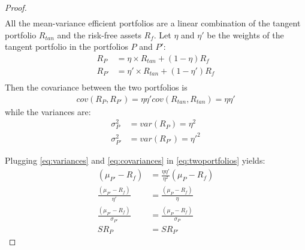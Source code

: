 \documentclass[10pt]{article}
\newenvironment{exercise}[2][Exercise]{\begin{trivlist}
  \item[\hskip \labelsep {\bfseries #1}\hskip \labelsep {\bfseries #2.}]}{\end{trivlist}}
\begin{document}
\begin{exercise}{1}
\begin{itemize}
\begin{proof}
\begin{align}
              \end{align}
              All the mean-variance efficient portfolios are a linear
              combination of the tangent portfolio $R_{tan}$ and the risk-free
              assets $R_f$. Let $\eta$ and $\eta'$ be the weights of the tangent
              portfolio in the portfolios $P$ and $P'$:
              \begin{align*}
                R_{P} &= \eta \times R_{tan} + (1 - \eta) R_f \\
                R_{P'} &= \eta' \times R_{tan} + (1 - \eta') R_f \\
              \end{align*}
              Then the covariance between the two portfolios is
              \begin{align}
                \label{eq:covariances}
                cov(R_P, R_{P'}) = \eta \eta' cov(R_{tan}, R_{tan}) = \eta \eta'
              \end{align}
              while the variances are:
              \begin{align}
                \label{eq:variances}
                \sigma^2_P &= var(R_{P}) = \eta^2 \\
                \sigma^2_{P'} &= var(R_{P'}) = \eta'^2
              \end{align}

              Plugging \autoref{eq:variances} and \autoref{eq:covariances} in
              \autoref{eq:twoportfolios} yields:
              \begin{align*}
                (\mu_{P'} - R_f) &= \frac{\eta \eta'}{\eta^2} (\mu_P - R_f) \\
                \frac{(\mu_{P'} - R_f)}{\eta'} &= \frac{(\mu_P - R_f)}{\eta} \\
                \frac{(\mu_{P'} - R_f)}{\sigma_{P'}} &= \frac{(\mu_P - R_f)}{\sigma_{P}} \\
                SR_{P} &= SR_{P'}
              \end{align*}
              \end{proof}
              
    \end{itemize}
  \end{exercise}
\end{document}

